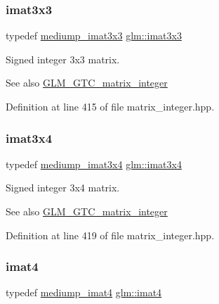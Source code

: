 \subsubsection{\texorpdfstring{imat3x3}{imat3x3}}
{\footnotesize\ttfamily typedef \hyperlink{group__gtc__matrix__integer_gac5ee8dc182055bb0a00a90c031d4a714}{mediump\+\_\+imat3x3} \hyperlink{group__gtc__matrix__integer_gaeff9ef8f56cccc828d6b897923e75402}{glm\+::imat3x3}}

Signed integer 3x3 matrix. \begin{DoxySeeAlso}{See also}
\hyperlink{group__gtc__matrix__integer}{G\+L\+M\+\_\+\+G\+T\+C\+\_\+matrix\+\_\+integer} 
\end{DoxySeeAlso}


Definition at line 415 of file matrix\+\_\+integer.\+hpp.

\mbox{\label{group__gtc__matrix__integer_gaee5507e6cbbdd05841a0c174e60dd036}} 
\subsubsection{\texorpdfstring{imat3x4}{imat3x4}}
{\footnotesize\ttfamily typedef \hyperlink{group__gtc__matrix__integer_gaaac79be4db34dde570c3331ffe728d55}{mediump\+\_\+imat3x4} \hyperlink{group__gtc__matrix__integer_gaee5507e6cbbdd05841a0c174e60dd036}{glm\+::imat3x4}}

Signed integer 3x4 matrix. \begin{DoxySeeAlso}{See also}
\hyperlink{group__gtc__matrix__integer}{G\+L\+M\+\_\+\+G\+T\+C\+\_\+matrix\+\_\+integer} 
\end{DoxySeeAlso}


Definition at line 419 of file matrix\+\_\+integer.\+hpp.

\mbox{\label{group__gtc__matrix__integer_ga40fc5c5e0b07543497aa1c314891544a}} 
\subsubsection{\texorpdfstring{imat4}{imat4}}
{\footnotesize\ttfamily typedef \hyperlink{group__gtc__matrix__integer_gabf1a0fd4c85a21f67535b737e1feb355}{mediump\+\_\+imat4} \hyperlink{group__gtc__matrix__integer_ga40fc5c5e0b07543497aa1c314891544a}{glm\+::imat4}}

